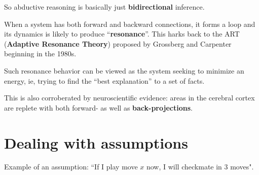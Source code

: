 So abductive reasoning is basically just \textbf{bidirectional} inference.

When a system has both forward and backward connections, it forms a loop and its dynamics is likely to produce ``\textbf{resonance}''.  This harks back to the ART (\textbf{Adaptive Resonance Theory}) proposed by Grossberg and Carpenter beginning in the 1980s.

Such resonance behavior can be viewed as the system seeking to minimize an energy, ie, trying to find the ``best explanation'' to a set of facts.  

This is also corroberated by neuroscientific evidence:  areas in the cerebral cortex are replete with both forward- as well as \textbf{back-projections}.

\section{Dealing with assumptions}

Example of an assumption:  ``If I play move $x$ now, I will checkmate in 3 moves".

